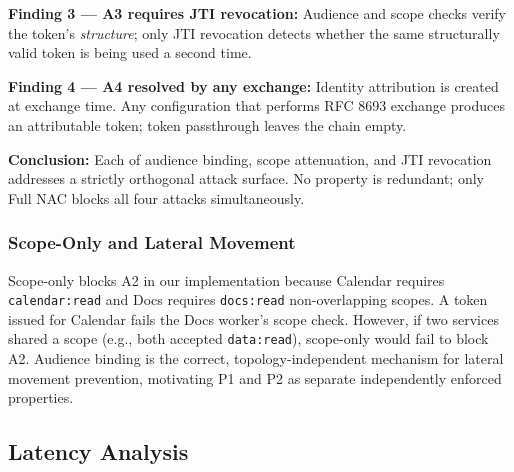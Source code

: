 \documentclass[journal]{IEEEtran}
\begin{document}
\textbf{Finding 3 — A3 requires JTI revocation:} Audience and scope checks
verify the token's \textit{structure}; only JTI revocation detects whether the
same structurally valid token is being used a second time.

\textbf{Finding 4 — A4 resolved by any exchange:} Identity attribution is
created at exchange time. Any configuration that performs RFC 8693 exchange
produces an attributable token; token passthrough leaves the chain empty.

\textbf{Conclusion:} Each of audience binding, scope attenuation, and JTI
revocation addresses a strictly orthogonal attack surface. No property is
redundant; only Full NAC blocks all four attacks simultaneously.

\subsubsection{Scope-Only and Lateral Movement}
\label{sec:scope_caveat}
Scope-only blocks A2 in our implementation because Calendar requires
\texttt{calendar:read} and Docs requires \texttt{docs:read} non-overlapping
scopes. A token issued for Calendar fails the Docs worker's scope check.
However, if two services shared a scope (e.g., both accepted \texttt{data:read}),
scope-only would fail to block A2. Audience binding is the correct,
topology-independent mechanism for lateral movement prevention, motivating P1
and P2 as separate independently enforced properties.

\subsection{Latency Analysis}

\begin{table}[h]
\caption{End-to-end latency of \texttt{prepare\_daily\_briefing} ($N=30$)}
\label{tab:latency}
\centering
\footnotesize
\setlength{\tabcolsep}{3pt}
\end{table}
\end{document}
